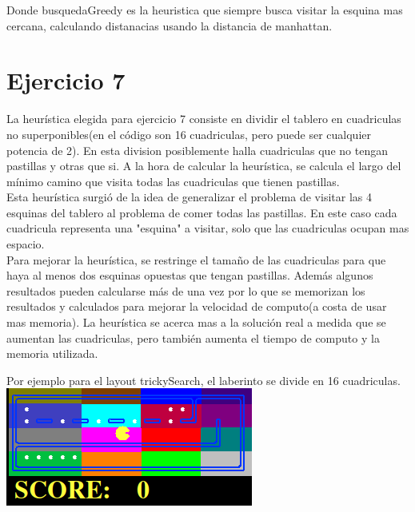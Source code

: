 \documentclass[12pt, titlepage, a4paper]{article}
\begin{document}
Donde busquedaGreedy es la heuristica que siempre busca visitar la esquina mas cercana, calculando distanacias usando
la distancia de manhattan.


\section{Ejercicio 7}

La heurística elegida para ejercicio 7 consiste en dividir el tablero en cuadriculas no superponibles(en el 
código son 16 cuadriculas, pero puede ser cualquier potencia de 2). En esta division posiblemente halla 
cuadriculas que no tengan pastillas y otras que si. A la hora de calcular la heurística, se calcula el largo 
del mínimo camino que visita todas las cuadriculas que tienen pastillas.\\

Esta heurística surgió de la idea de generalizar el problema de visitar las 4 esquinas del tablero al problema
de comer todas las pastillas. En este caso cada cuadricula representa una "esquina" a visitar, solo que las 
cuadriculas ocupan mas espacio.\\

Para mejorar la heurística, se restringe el tamaño de las cuadriculas para que haya al menos dos esquinas 
opuestas que tengan pastillas. Además algunos resultados pueden calcularse más de una vez por lo que se 
memorizan los resultados y calculados para mejorar la velocidad de computo(a costa de usar mas memoria). 
La heurística se acerca mas a la solución real a medida que se aumentan las cuadriculas, pero también aumenta
el tiempo de computo y la memoria utilizada.\\

\newpage

Por ejemplo para el layout trickySearch, el laberinto se divide en 16 cuadriculas.\\

\includegraphics[width=.8\textwidth]{Imagenes/Captura desde 2025-04-09 20-07-23.png}\\
\end{document}
